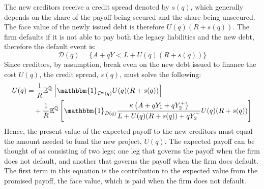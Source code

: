 \documentclass[../main.tex]{subfiles}
\begin{document}
        The new creditors receive a credit spread denoted by $s(q)$,
        which generally depends on the share of the payoff being secured and the share being unsecured.
        The face value of the newly issued debt is therefore $U(q)(R + s(q))$.
        The firm defaults if it is not able to pay both the legacy liabilities and the new debt,
        therefore the default event is:
            \begin{equation*}
                \mathcal{D}(q)
                = 
                \{
                    A + qY < L + U(q)(R + s(q))
                \}
            \end{equation*}
        Since creditors, by assumption, break even on the new debt issued to finance the cost $U(q)$,
        the credit spread, $s(q)$, must solve the following:
            \begin{align}
                    U(q) 
                &=
                    \discountfactor
                    \mathbb{E}^{\rnmeasure}\left[
                        \mathbbm{1}_{\mathcal{D}^{c}(q)}
                        U(q)
                        (\grossrfrate + s(q))
                    \right]
                \nonumber \\
                &\quad+
                    \discountfactor
                    \mathbb{E}^{\rnmeasure}\left[
                        \mathbbm{1}_{\mathcal{D}(q)}
                        \frac{
                            \kappa 
                            \left(
                                A + q Y_{1} + q Y_{2}^{+}
                            \right)
                        }{
                            L 
                            +
                            U(q)
                            (\grossrfrate + s(q))
                            +
                            q Y_{2}^{-} 
                        } 
                        U(q)
                        (\grossrfrate + s(q))    
                    \right] 
                \label{eqn:new-creditors-breakeven}
            \end{align}
        Hence, the present value of the expected payoff to the new creditors
        must equal the amount needed to fund the new project, $U(q)$. 
        The expected payoff can be thought of as consisting of two legs;
        one leg that governs the payoff when the firm does not default, 
        and another that governs the payoff when the firm does default. 
        The first term in this equation is the contribution to the expected value from the promised payoff,
        the face value, which is paid when the firm does not default. 
\end{document}
